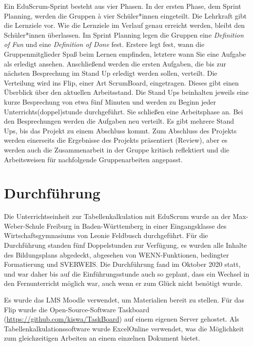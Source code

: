 \documentclass[twoside,twocolumn]{article}
\begin{document}
Ein EduScrum-Sprint besteht aus vier Phasen. In der ersten Phase, dem Sprint Planning, werden die Gruppen à vier Schüler*innen eingeteilt. Die Lehrkraft gibt die Lernziele vor. Wie die Lernziele im Verlauf genau erreicht werden, bleibt den Schüler*innen überlassen. Im Sprint Planning legen die Gruppen eine \textit{Definition of Fun} und eine \textit{Definition of Done} fest. Erstere legt fest, wann die Gruppenmitglieder Spaß beim Lernen empfinden, letztere wann Sie eine Aufgabe als erledigt ansehen. Anschließend werden die ersten Aufgaben, die bis zur nächsten Besprechung im Stand Up erledigt werden sollen, verteilt. Die Verteilung wird ins Flip, einer Art ScrumBoard, eingetragen. Dieses gibt einen Überblick über den aktuellen Arbeitsstand. Die Stand Ups beinhalten jeweils eine kurze Besprechung von etwa fünf Minuten und werden zu Beginn jeder Unterrichts(doppel)stunde durchgeführt. Sie schließen eine Arbeitsphase an. Bei den Besprechungen werden die Aufgaben neu verteilt. Es gibt mehrere Stand Ups, bis das Projekt zu einem Abschluss kommt. Zum Abschluss des Projekts werden einerseits die Ergebnisse des Projekts präsentiert (Review), aber es werden auch die Zusammenarbeit in der Gruppe kritisch reflektiert und die Arbeitsweisen für nachfolgende Gruppenarbeiten angepasst.


\section{Durchführung}

Die Unterrichtseinheit zur Tabellenkalkulation mit EduScrum wurde an der Max-Weber-Schule Freiburg in Baden-Württemberg in einer Eingangsklasse des Wirtschaftsgymnasiums von Leonie Feldbusch durchgeführt. Für die Durchführung standen fünf Doppelstunden zur Verfügung, es wurden alle Inhalte des Bildungsplans abgedeckt, abgesehen von WENN-Funktionen, bedingter Formatierung und SVERWEIS. Die Durchführung fand im Oktober 2020 statt, und war daher bis auf die Einführungsstunde auch so geplant, dass ein Wechsel in den Fernunterricht möglich war, auch wenn er zum Glück nicht benötigt wurde.

Es wurde das LMS Moodle verwendet, um Materialien bereit zu stellen. Für das Flip wurde die Open-Source-Software Taskboard (\url{https://github.com/kiswa/TaskBoard}) auf einem eigenen Server gehostet. Als Tabellenkalkulationssoftware wurde ExcelOnline verwendet, was die Möglichkeit zum gleichzeitigen Arbeiten an einem einzelnen Dokument bietet.
\end{document}
